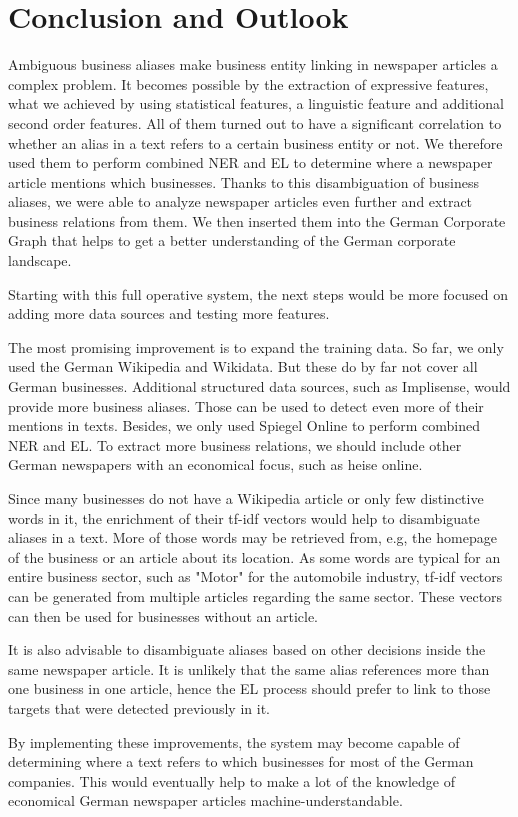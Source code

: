 \section{Conclusion and Outlook}
\label{sec:conclusion}
Ambiguous business aliases make business entity linking in newspaper articles a complex problem. It becomes possible by the extraction of expressive features, what we achieved by using statistical features, a linguistic feature and additional second order features. All of them turned out to have a significant correlation to whether an alias in a text refers to a certain business entity or not. We therefore used them to perform combined NER and EL to determine where a newspaper article mentions which businesses. Thanks to this disambiguation of business aliases, we were able to analyze newspaper articles even further and extract business relations from them. We then inserted them into the German Corporate Graph that helps to get a better understanding of the German corporate landscape.

Starting with this full operative system, the next steps would be more focused on adding more data sources and testing more features.

The most promising improvement is to expand the training data. So far, we only used the German Wikipedia and Wikidata. But these do by far not cover all German businesses. Additional structured data sources, such as Implisense, would provide more business aliases. Those can be used to detect even more of their mentions in texts. Besides, we only used Spiegel Online to perform combined NER and EL. To extract more business relations, we should include other German newspapers with an economical focus, such as heise online\footnotemark{}.

Since many businesses do not have a Wikipedia article or only few distinctive words in it, the enrichment of their tf-idf vectors would help to disambiguate aliases in a text. More of those words may be retrieved from, e.g, the homepage of the business or an article about its location. As some words are typical for an entire business sector, such as "Motor" for the automobile industry, tf-idf vectors can be generated from multiple articles regarding the same sector. These vectors can then be used for businesses without an article.

It is also advisable to disambiguate aliases based on other decisions inside the same newspaper article. It is unlikely that the same alias references more than one business in one article, hence the EL process should prefer to link to those targets that were detected previously in it.

By implementing these improvements, the system may become capable of determining where a text refers to which businesses for most of the German companies. This would eventually help to make a lot of the knowledge of economical German newspaper articles machine-understandable.
